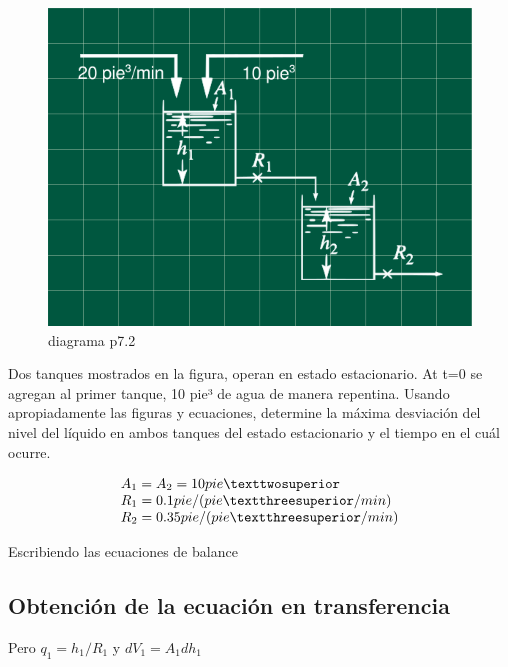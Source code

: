 \documentclass[
  letterpaper,
  DIV=11,
  numbers=noendperiod]{scrreprt}
\begin{document}
\begin{figure}

{\centering \includegraphics{././images/p7.2-coughanowr/headercontrol72.png}

}

\caption{diagrama p7.2}

\end{figure}

Dos tanques mostrados en la figura, operan en estado estacionario. At
t=0 se agregan al primer tanque, 10 pie³ de agua de manera repentina.
Usando apropiadamente las figuras y ecuaciones, determine la máxima
desviación del nivel del líquido en ambos tanques del estado
estacionario y el tiempo en el cuál ocurre.

\[
\begin{array}{l}
A_1=A_2=10\space pie²\\
R_1=0.1\space pie/(pie³/min)\\
R_2=0.35\space pie/(pie³/min)\\
\end{array}
\]

Escribiendo las ecuaciones de balance

\hypertarget{obtenciuxf3n-de-la-ecuaciuxf3n-en-transferencia-1}{%
\subsection{Obtención de la ecuación en
transferencia}\label{obtenciuxf3n-de-la-ecuaciuxf3n-en-transferencia-1}}

Pero \(q_1 = h_1/R_1\) y \(dV_1 = A_1dh_1\)
\end{document}
